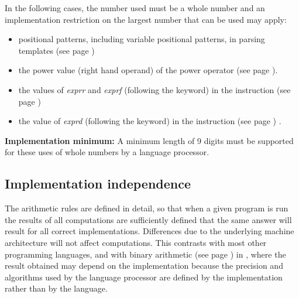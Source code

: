 In the following cases, the number used must be a whole number and
an implementation restriction on the largest number that can be used
may apply:
\begin{itemize}
\item positional patterns, including variable positional patterns,
in  parsing templates (see page \pageref{refparsing}) 
\item the power value (right hand operand) of the power operator (see page \pageref{refpower}).
\item the values of \emph{exprr} and \emph{exprf} (following the
 keyword) in the   instruction (see page \pageref{refloop}) 
\item the value of \emph{exprd} (following the 
keyword) in the   instruction (see page \pageref{refnumeric}) .
\end{itemize}
 \textbf{Implementation minimum:} A minimum length of 9 digits must
be supported for these uses of whole numbers by a \nr{} language
processor.
\subsection{Implementation independence}
 The \nr{} arithmetic rules are defined in detail, so that when a
given program is run the results of all computations are sufficiently
defined that the same answer will result for all correct
implementations.  Differences due to the underlying machine
architecture will not affect computations.
 This contrasts with most other programming languages, and with
 binary arithmetic (see page \pageref{refbinary})  in \nr{}, where the
result obtained may depend on the implementation because the precision
and algorithms used by the language processor are defined by the
implementation rather than by the language.
